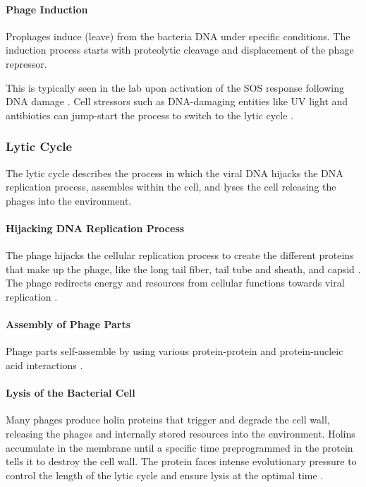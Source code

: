\paragraph{Phage Induction}
Prophages induce (leave) from the bacteria DNA under specific conditions. 
The induction process starts with proteolytic cleavage and displacement of the phage repressor. 

This is typically seen in the lab upon activation of the SOS response following DNA damage \cite{waldorPhageRegulatoryCircuits2005}. 
Cell stressors such as DNA-damaging entities like UV light and antibiotics can jump-start the process to switch to the lytic cycle \cite{stoneUnderstandingExploitingPhage2019, fortierImportanceProphagesEvolution2013}. 

\subsubsection{Lytic Cycle}
The lytic cycle describes the process in which the viral DNA hijacks the DNA replication process, assembles within the cell, and lyses the cell releasing the phages into the environment. 
\paragraph{Hijacking DNA Replication Process}
The phage hijacks the cellular replication process to create the different proteins that make up the phage, like the long tail fiber, tail tube and sheath, and capsid . 
The phage redirects energy and resources from cellular functions towards viral replication \cite{warwick-dugdaleHosthijackingPlanktonicPiracy2019}. 
\paragraph{Assembly of Phage Parts}
Phage parts self-assemble by using various protein-protein and protein-nucleic acid interactions \cite{aksyukBacteriophageAssembly2011}. 
\paragraph{Lysis of the Bacterial Cell}
Many phages produce holin proteins that trigger and degrade the cell wall, releasing the phages and internally stored resources into the environment. 
Holins accumulate in the membrane until a specific time preprogrammed in the protein tells it to destroy the cell wall. 
The protein faces intense evolutionary pressure to control the length of the lytic cycle and ensure lysis at the optimal time \cite{wangHolinsProteinClocks2000}. 

